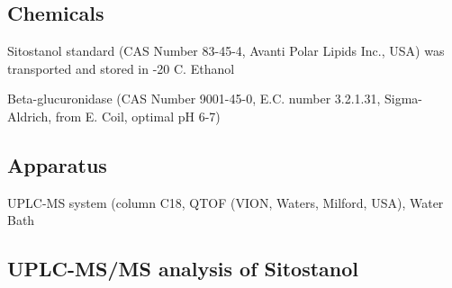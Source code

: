 \subsection{Chemicals}
Sitostanol standard (CAS Number 83-45-4, Avanti Polar Lipids Inc., USA) was transported and stored in -20 \degree C. Ethanol

Beta-glucuronidase (CAS Number 9001-45-0, E.C. number 3.2.1.31, Sigma-Aldrich, from E. Coil, optimal pH 6-7)

\subsection{Apparatus}
UPLC-MS system (column C18, QTOF (VION, Waters, Milford, USA), Water Bath


\subsection{UPLC-MS/MS analysis of Sitostanol}

